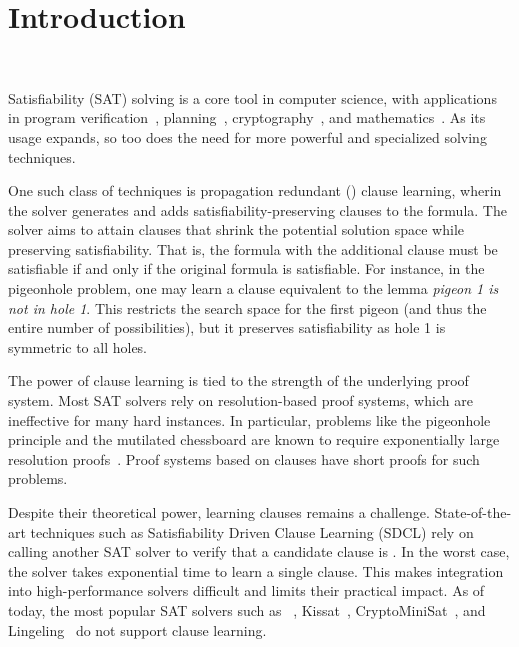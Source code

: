 \section{Introduction}~\label{sec:intro}


Satisfiability (SAT) solving is a core tool in computer science, with applications in program verification~\cite{BillionQueries,sat-hardwareverification,ic3,bmc}, planning~\cite{planning,planningassat}, cryptography~\cite{cryptominisat}, and mathematics~\cite{chromaticnumber,pythagoreantriples,kellersconjecture,emptyhexagon}. As its usage expands, so too does the need for more powerful and specialized solving techniques.



One such class of techniques is propagation redundant (\pr) clause learning, wherin the solver generates and adds satisfiability-preserving clauses to the formula. The solver aims to attain clauses that shrink the potential solution space while preserving satisfiability. That is, the formula with the additional clause must be satisfiable if and only if the original formula is satisfiable. For instance, in the pigeonhole problem, one may learn a clause equivalent to the lemma \emph{pigeon 1 is not in hole 1}. This restricts the search space for the first pigeon (and thus the entire number of possibilities), but it preserves satisfiability as hole 1 is symmetric to all holes.



The power of clause learning is tied to the strength of the underlying proof system. Most SAT solvers rely on resolution-based proof systems, which are ineffective for many hard instances. In particular, problems like the pigeonhole principle and the mutilated chessboard are known to require exponentially large resolution proofs~\cite{hakenpigeonhole,mutilatedchessboard-exponential}. Proof systems based on \pr clauses have short proofs for such problems.

Despite their theoretical power, learning \pr clauses remains a challenge. State-of-the-art techniques such as Satisfiability Driven Clause Learning (SDCL) rely on calling another SAT solver to verify that a candidate clause is \pr \cite{sadical}. 
In the worst case, the solver takes exponential time to learn a single \pr clause. This makes integration into high-performance solvers difficult and limits their practical impact. As of today, the most popular SAT solvers such as \cadical~\cite{cadical}, Kissat~\cite{kissat}, CryptoMiniSat~\cite{cryptominisat}, and Lingeling~\cite{lingeling} do not support \pr clause learning.


